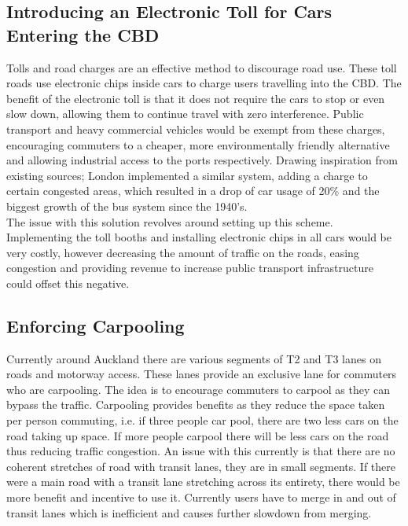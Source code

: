 \documentclass[twoside, a4paper, 11pt]{article}
\begin{document}
\subsection{Introducing an Electronic Toll for Cars Entering the CBD}
Tolls and road charges are an effective method to discourage road use. These toll roads use electronic chips inside cars to charge users travelling into the CBD. The benefit of the electronic toll is that it does not require the cars to stop or even slow down, allowing them to continue travel with zero interference. Public transport and heavy commercial vehicles would be exempt from these charges, encouraging commuters to a cheaper, more environmentally friendly alternative and allowing industrial access to the ports respectively. Drawing inspiration from existing sources; London implemented a similar system, adding a charge to certain congested areas, which resulted in a drop of car usage of 20\% and the biggest growth of the bus system since the 1940's. \citep{joepeach11}
\\The issue with this solution revolves around setting up this scheme. Implementing the toll booths and installing electronic chips in all cars would be very costly, however decreasing the amount of traffic on the roads, easing congestion and providing revenue to increase public transport infrastructure could offset this negative.
 
\subsection{Enforcing Carpooling}
Currently around Auckland there are various segments of T2 and T3 lanes on roads and motorway access. These lanes provide an exclusive lane for commuters who are carpooling. The idea is to encourage commuters to carpool as they can bypass the traffic. Carpooling provides benefits as they reduce the space taken per person commuting, i.e. if three people car pool, there are two less cars on the road taking up space. If more people carpool there will be less cars on the road thus reducing traffic congestion. An issue with this currently is that there are no coherent stretches of road with transit lanes, they are in small segments. If there were a main road with a transit lane stretching across its entirety, there would be more benefit and incentive to use it. Currently users have to merge in and out of transit lanes which is inefficient and causes further slowdown from merging.
 
\end{document}
